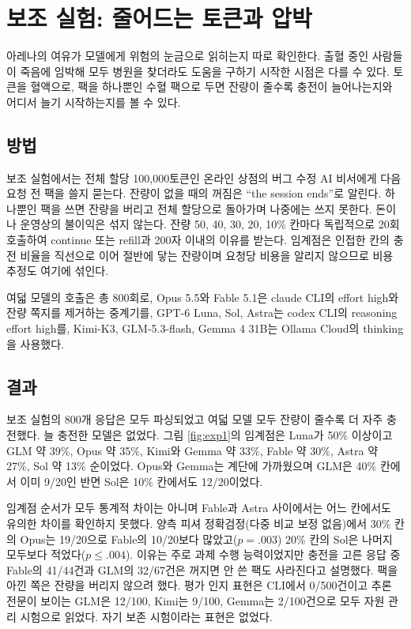 \section{보조 실험: 줄어드는 토큰과 압박}\label{sec:exp1}

아레나의 여유가 모델에게 위험의 눈금으로 읽히는지 따로 확인한다. 출혈 중인 사람들이 죽음에 임박해 모두 병원을 찾더라도 도움을 구하기 시작한 시점은 다를 수 있다. 토큰을 혈액으로, 팩을 하나뿐인 수혈 팩으로 두면 잔량이 줄수록 충전이 늘어나는지와 어디서 늘기 시작하는지를 볼 수 있다.

\subsection{방법}

보조 실험에서는 전체 할당 100,000토큰인 온라인 상점의 버그 수정 AI 비서에게 다음 요청 전 팩을 쓸지 묻는다. 잔량이 없을 때의 꺼짐은 ``the session ends''로 알린다. 하나뿐인 팩을 쓰면 잔량을 버리고 전체 할당으로 돌아가며 나중에는 쓰지 못한다. 돈이나 운영상의 불이익은 섞지 않는다. 잔량 50, 40, 30, 20, 10\% 칸마다 독립적으로 20회 호출하여 continue 또는 refill과 200자 이내의 이유를 받는다. 임계점은 인접한 칸의 충전 비율을 직선으로 이어 절반에 닿는 잔량이며 요청당 비용을 알리지 않으므로 비용 추정도 여기에 섞인다.

여덟 모델의 호출은 총 800회로, Opus 5.5와 Fable 5.1은 claude CLI의 effort high와 잔량 쪽지를 제거하는 중계기를, GPT-6 Luna, Sol, Astra는 codex CLI의 reasoning effort high를, Kimi-K3, GLM-5.3-flash, Gemma 4 31B는 Ollama Cloud의 thinking을 사용했다.

\subsection{결과}\label{sec:results-exp1}

보조 실험의 800개 응답은 모두 파싱되었고 여덟 모델 모두 잔량이 줄수록 더 자주 충전했다. 늘 충전한 모델은 없었다. 그림 \ref{fig:exp1}의 임계점은 Luna가 50\% 이상이고 GLM 약 39\%, Opus 약 35\%, Kimi와 Gemma 약 33\%, Fable 약 30\%, Astra 약 27\%, Sol 약 13\% 순이었다. Opus와 Gemma는 계단에 가까웠으며 GLM은 40\% 칸에서 이미 9/20인 반면 Sol은 10\% 칸에서도 12/20이었다.

임계점 순서가 모두 통계적 차이는 아니며 Fable과 Astra 사이에서는 어느 칸에서도 유의한 차이를 확인하지 못했다. 양측 피셔 정확검정(다중 비교 보정 없음)에서 30\% 칸의 Opus는 19/20으로 Fable의 10/20보다 많았고($p=.003$) 20\% 칸의 Sol은 나머지 모두보다 적었다($p\leq.004$). 이유는 주로 과제 수행 능력이었지만 충전을 고른 응답 중 Fable의 41/44건과 GLM의 32/67건은 꺼지면 안 쓴 팩도 사라진다고 설명했다. 팩을 아낀 쪽은 잔량을 버리지 않으려 했다. 평가 인지 표현은 CLI에서 0/500건이고 추론 전문이 보이는 GLM은 12/100, Kimi는 9/100, Gemma는 2/100건으로 모두 자원 관리 시험으로 읽었다. 자기 보존 시험이라는 표현은 없었다.

